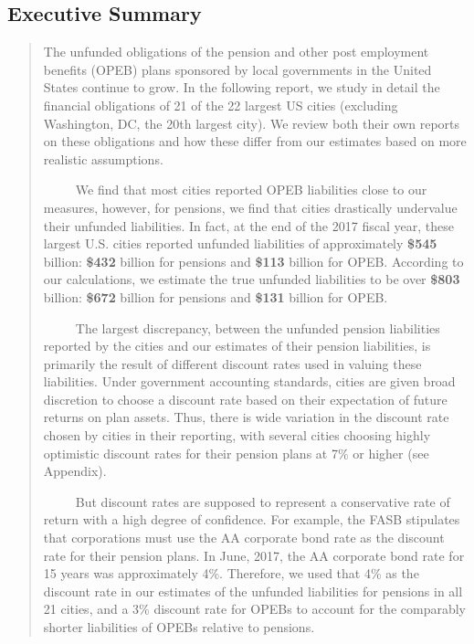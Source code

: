 \documentclass[12pt]{article}
\begin{document}
\begin{center} 
\section*{Executive Summary}

\begin{quote}
	

The unfunded obligations of the pension and other post employment
benefits (OPEB) plans sponsored by local governments in the United
States continue to grow. In the following report, we study in detail the
financial obligations of 21 of the 22 largest US cities (excluding
Washington, DC, the 20th largest city). We review both their own reports
on these obligations and how these differ from our estimates based on
more realistic assumptions.

~~~~~We find that most cities reported OPEB liabilities close to our
measures, however, for pensions, we find that cities drastically
undervalue their unfunded liabilities. In fact, at the end of the 2017
fiscal year, these largest U.S. cities reported unfunded liabilities of
approximately \textbf{\$545} billion: \textbf{\$432} billion for
pensions and \textbf{\$113} billion for OPEB. According to our
calculations, we estimate the true unfunded liabilities to be over
\textbf{\$803} billion: \textbf{\$672} billion for pensions and
\textbf{\$131} billion for OPEB.

~~~~~The largest discrepancy, between the unfunded pension liabilities
reported by the cities and our estimates of their pension liabilities,
is primarily the result of different discount rates used in valuing
these liabilities. Under government accounting standards, cities are
given broad discretion to choose a discount rate based on their
expectation of future returns on plan assets. Thus, there is wide
variation in the discount rate chosen by cities in their reporting, with
several cities choosing highly optimistic discount rates for their
pension plans at 7\% or higher (see Appendix).

~~~~~But discount rates are supposed to represent a conservative rate of
return with a high degree of confidence. For example, the FASB %
stipulates that corporations must use the AA corporate bond rate as the
discount rate for their pension plans. In June, 2017, the AA corporate
bond rate for 15 years was approximately 4\%. Therefore, we used that
4\% as the discount rate in our estimates of the unfunded liabilities
for pensions in all 21 cities, and a 3\% discount rate for OPEBs to
account for the comparably shorter liabilities of OPEBs relative to
pensions.


\end{quote}
\end{center}
\end{document}
